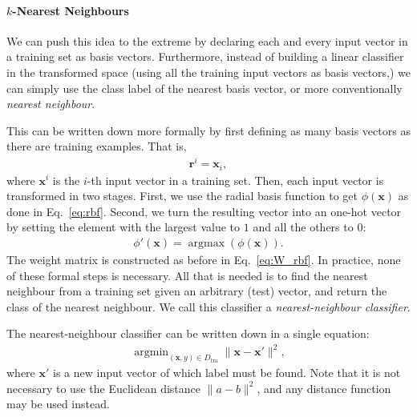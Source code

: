 \documentclass{report}
\newcommand{\vect}[1]{\mathbf{#1}}
\newcommand{\vx}[0]{\vect{x}}
\newcommand{\vr}[0]{\vect{r}}
\DeclareMathOperator*{\argmax}{\arg \max}
\DeclareMathOperator*{\argmin}{\arg \min}
\begin{document}
\paragraph{$k$-Nearest Neighbours}

We can push this idea to the extreme by declaring each and every input vector in
a training set as basis vectors. Furthermore, instead of building a linear
classifier in the transformed space (using all the training input vectors as
basis vectors,) we can simply use the class label of the nearest basis vector,
or more conventionally {\it nearest neighbour}. 

This can be written down more formally by first defining as many basis vectors
as there are training examples. That is,
\begin{align*}
    \vr^i = \vx_i,
\end{align*}
where $\vx^i$ is the $i$-th input vector in a training set. Then, each input
vector is transformed in two stages. First, we use the radial basis function to
get $\phi(\vx)$ as done in Eq.~\eqref{eq:rbf}. Second, we turn the resulting
vector into an one-hot vector by setting the element with the largest value to
$1$ and all the others to $0$:
\begin{align*}
    \phi'(\vx) = \argmax(\phi(\vx)).
\end{align*}
The weight matrix is constructed as before in Eq.~\eqref{eq:W_rbf}.  In
practice, none of these formal steps is necessary. All that is needed is to find
the nearest neighbour from a training set given an arbitrary (test) vector, and
return the class of the nearest neighbour. We call this classifier a {\it
nearest-neighbour classifier}.

The nearest-neighbour classifier can be written down in a single equation:
\begin{align*}
    \argmin_{(\vx, y) \in D_{\text{tra}}} \| \vx - \vx' \|^2,
\end{align*}
where $\vx'$ is a new input vector of which label must be found. Note that it is
not necessary to use the Euclidean distance $\| a - b \|^2$, and any distance
function may be used instead.
\end{document}
